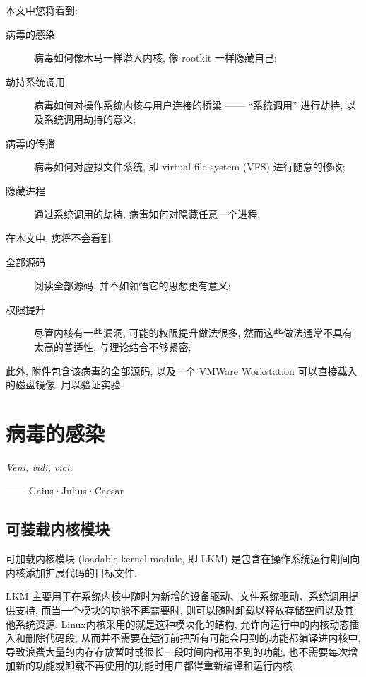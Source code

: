 \documentclass[11pt,fleqn]{book} %
\begin{document}
本文中您将看到:
\begin{description}
\item [{病毒的感染}] 病毒如何像木马一样潜入内核, 像 rootkit 一样隐藏自己;
\item [{劫持系统调用}] 病毒如何对操作系统内核与用户连接的桥梁 —— ``系统调用'' 进行劫持, 以及系统调用劫持的意义;
\item [{病毒的传播}] 病毒如何对虚拟文件系统, 即 virtual file system (VFS) 进行随意的修改;
\item [{隐藏进程}] 通过系统调用的劫持, 病毒如何对隐藏任意一个进程.
\end{description}


在本文中, 您将不会看到:
\begin{description}
\item [{全部源码}] 阅读全部源码, 并不如领悟它的思想更有意义;
\item [{权限提升}] 尽管内核有一些漏洞, 可能的权限提升做法很多, 然而这些做法通常不具有太高的普适性, 与理论结合不够紧密;
\end{description}


此外, 附件包含该病毒的全部源码, 以及一个 VMWare Workstation 可以直接载入的磁盘镜像, 用以验证实验.

\newpage{}


\chapter{病毒的感染}



\vspace*{2cm}

\textit{Veni, vidi, vici.}

\begin{flushright}
—— Gaius·Julius·Caesar
\par\end{flushright}

\newpage{}


\section{可装载内核模块}



可加载内核模块 (loadable kernel module, 即 LKM) 是包含在操作系统运行期间向内核添加扩展代码的目标文件.

LKM 主要用于在系统内核中随时为新增的设备驱动、文件系统驱动、系统调用提供支持, 而当一个模块的功能不再需要时, 则可以随时卸载以释放存储空间以及其他系统资源.
Linux内核采用的就是这种模块化的结构, 允许向运行中的内核动态插入和删除代码段, 从而并不需要在运行前把所有可能会用到的功能都编译进内核中,
导致浪费大量的内存存放暂时或很长一段时间内都用不到的功能, 也不需要每次增加新的功能或卸载不再使用的功能时用户都得重新编译和运行内核.
 
\end{document}
